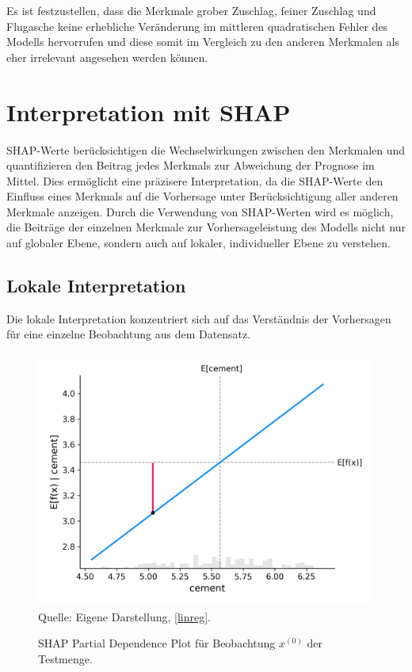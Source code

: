 Es ist festzustellen, dass die Merkmale grober Zuschlag, feiner Zuschlag und Flugasche keine erhebliche Veränderung im mittleren quadratischen
Fehler des Modells hervorrufen und diese somit im Vergleich zu den anderen Merkmalen als eher irrelevant angesehen werden können.

\section{Interpretation mit SHAP}

SHAP-Werte berücksichtigen die Wechselwirkungen zwischen den Merkmalen und 
quantifizieren den Beitrag jedes Merkmals zur Abweichung der Prognose im Mittel. 
Dies ermöglicht eine präzisere Interpretation, da die SHAP-Werte den Einfluss 
eines Merkmals auf die Vorhersage unter Berücksichtigung aller anderen Merkmale anzeigen. 
Durch die Verwendung von SHAP-Werten wird 
es möglich, die Beiträge der einzelnen Merkmale zur Vorhersageleistung des Modells nicht nur 
auf globaler Ebene, sondern auch auf lokaler, individueller Ebene zu verstehen. 

\subsection{Lokale Interpretation}

Die lokale Interpretation konzentriert sich auf das Verständnis der Vorhersagen 
für eine einzelne Beobachtung aus dem Datensatz.

\begin{figure}[!h]
    \caption{SHAP Partial Dependence Plot für Beobachtung $x^{(0)}$ der Testmenge.}
    \includegraphics[width=1\textwidth]{../scripts/images/shap_dependence_plot.png}
    Quelle: Eigene Darstellung, \ref{linreg}.
    \label{pic:shap_dependence}
\end{figure}

